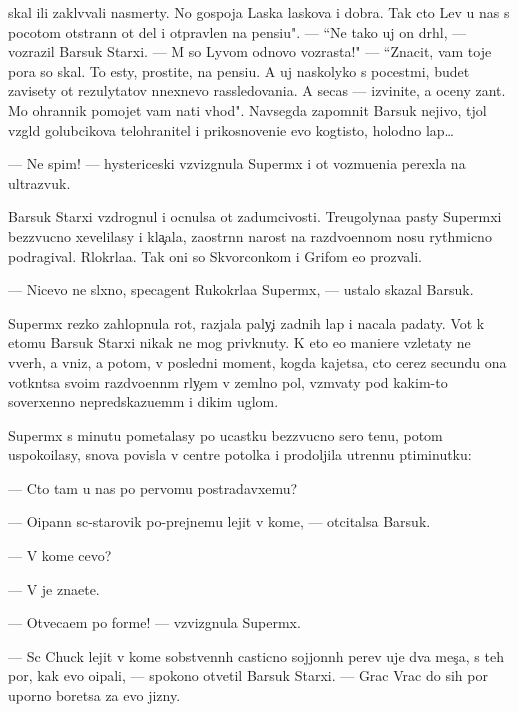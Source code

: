 \documentclass[12pt]{book}
\begin{document}
skal{\yi} ili zakl{\e}v{\yi}vali nasmerty. No gospoja Laska laskova i dobra. Tak cto Lev u nas s pocotom otstran{\e}n ot del i otpravlen na pensi{\y}u". — ``Ne tako{\y} uj on dr{\ia}hl{\yi}{\y}, — vozrazil Barsuk Starxi{\y}. — M{\yi} so Lyvom odnovo vozrasta!" — ``Znacit, vam toje pora so skal{\yi}. To {\y}esty, prostite, na pensi{\y}u. A uj naskolyko s pocest{\ia}mi, budet zavisety ot rezulytatov n{\yi}nexnevo rassledovani{\y}a. A se{\y}cas — izvinite, {\y}a oceny zan{\ia}t. Mo{\y} ohrannik pomojet vam na{\y}ti v{\yi}hod". Navsegda zapomnit Barsuk nejivo{\y}, t{\ia}jol{\yi}{\y} vzgl{\ia}d golubcikova telohranitel{\ia} i prikosnoveni{\y}e {\y}evo kogtisto{\y}, holodno{\y} lap{\yi}…

— Ne spim! — hystericeski vzvizgnula Superm{\yi}x i ot vozmu{\x}eni{\y}a perexla na ultrazvuk.

Barsuk Starxi{\y} vzdrognul i ocnulsa ot zadumcivosti. Treugolyna{\y}a pasty Superm{\yi}xi bezzvucno xevelilasy i kla{\c}ala, zaostr{\e}nn{\yi}{\y} narost na razdvo{\y}ennom nosu rythmicno podragival. R{\yi}lokr{\yi}la{\y}a. Tak oni so Skvorconkom i Grifom {\y}e{\y}o prozvali.

— Nicevo ne sl{\yi}xno, specagent Rukokr{\yi}la{\y}a Superm{\yi}x, — ustalo skazal Barsuk.

Superm{\yi}x rezko zahlopnula rot, razjala paly{\c}i zadnih lap i nacala padaty. Vot k etomu Barsuk Starxi{\y} nikak ne mog priv{\yi}knuty. K eto{\y} {\y}e{\y}o maniere vzletaty ne vverh, a vniz, a potom, v posledni{\y} moment, kogda kajetsa, cto cerez secundu ona votkn{\e}tsa svo{\y}im razdvo{\y}enn{\yi}m r{\yi}ly{\c}em v zeml{\ia}no{\y} pol, vzm{\yi}vaty pod kakim-to soverxenno nepredskazu{\y}em{\yi}m i dikim uglom.

Superm{\yi}x s minutu pometalasy po ucastku bezzvucno{\y} sero{\y} ten{\y}u, potom uspoko{\y}ilasy, snova povisla v centre potolka i prodoljila utrenn{\io}{\y}u p{\ia}\-ti\-mi\-nut\-ku:

— Cto tam u nas po pervomu postradavxemu?

— O{\x}ipann{\yi}{\y} s{\yi}c-star{\y}ov{\x}ik po-prejnemu lejit v kome, — otcitalsa Barsuk.

— V kome cevo?

— V{\yi} je zna{\y}ete.

— Otveca{\y}em po forme! — vzvizgnula Superm{\yi}x.

— S{\yi}c Chuck lejit v kome sobstvenn{\yi}h casticno sojjonn{\yi}h per{\y}ev uje dva mes{\ia}{\c}a, s teh por, kak {\y}evo o{\x}ipali, — spo\-ko{\y}\-no otvetil Barsuk Starxi{\y}. — Grac Vrac do sih por uporno boretsa za {\y}evo jizny.
\end{document}
